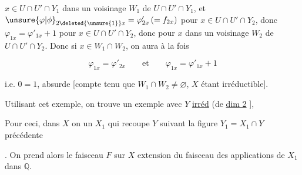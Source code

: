 
$x\in U\cap U'\cap Y_1$  dans un voisinage $W_1$ de $U\cap U'\cap Y_1$, et $\unsure{\varphi|\phi}_{2\deleted{\unsure{1}}x}=\varphi'_{2x}\,(=f_{2x})$  pour $x\in U\cap U'\cap Y_2$, donc $\varphi_{1x}=\varphi'_{1x}+1$ pour $x\in U\cap U'\cap Y_2$, donc pour $x$ dans un voisinage $W_2$ de $U\cap U'\cap Y_{2}$. Donc si $x\in W_1\cap W_2$, on aura  à la fois

\[
\varphi_{1x}=\varphi'_{2x}\qquad\text{et}\qquad\varphi_{1x}=\varphi'_{1x}+1
\]

i.e. $0=1$, absurde [compte tenu que $W_1\cap W_2\ne\varnothing$, $X$ étant irréductible].

Utilisant cet exemple, on trouve un exemple avec $Y$ \uline{irréd} (de \uline{dim 2} ],

Pour ceci, dans $X$ on  un $X_1$  qui recoupe $Y$ suivant la figure $Y_1=X_1\cap Y$ précédente



. On prend alors le faisceau $F$ sur $X$ extension  du faisceau des applications de $X_1$ dans $\mathbb{Q}$.
